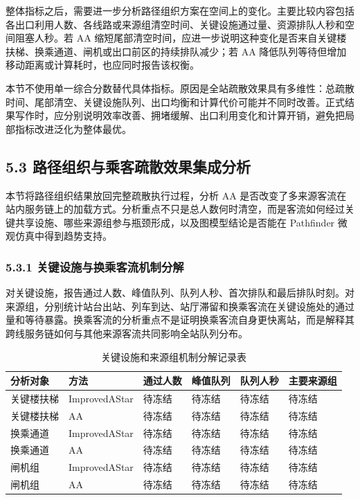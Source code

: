 \documentclass[UTF8,a4paper,12pt]{ctexart}
\begin{document}
整体指标之后，需要进一步分析路径组织方案在空间上的变化。主要比较内容包括各出口利用人数、各线路或来源组清空时间、关键设施通过量、资源排队人秒和空间阻塞人秒。若 AA 缩短尾部清空时间，应进一步说明这种变化是否来自关键楼扶梯、换乘通道、闸机或出口前区的持续排队减少；若 AA 降低队列等待但增加移动距离或计算耗时，也应同时报告该权衡。

本节不使用单一综合分数替代具体指标。原因是全站疏散效果具有多维性：总疏散时间、尾部清空、关键设施队列、出口均衡和计算代价可能并不同时改善。正式结果写作时，应分别说明效率改善、拥堵缓解、出口利用变化和计算开销，避免把局部指标改进泛化为整体最优。

\subsection{5.3 路径组织与乘客疏散效果集成分析}

本节将路径组织结果放回完整疏散执行过程，分析 AA 是否改变了多来源客流在站内服务链上的加载方式。分析重点不只是总人数何时清空，而是客流如何经过关键共享设施、哪些来源组参与瓶颈形成，以及图模型结论是否能在 Pathfinder 微观仿真中得到趋势支持。

\subsubsection{5.3.1 关键设施与换乘客流机制分解}

对关键设施，报告通过人数、峰值队列、队列人秒、首次排队和最后排队时刻。对来源组，分别统计站台出站、列车到达、站厅滞留和换乘客流在关键设施处的通过量和等待暴露。换乘客流的分析重点不是证明换乘客流自身更快离站，而是解释其跨线服务链如何与其他来源客流共同影响全站队列分布。

\begin{table}[htbp]
\centering
\caption{关键设施和来源组机制分解记录表}
\small
\begin{tabular}{p{}p{}p{}p{}p{}p{}}
\toprule
分析对象 & 方法 & 通过人数 & 峰值队列 & 队列人秒 & 主要来源组 \\
\midrule
关键楼扶梯 & ImprovedAStar & 待冻结 & 待冻结 & 待冻结 & 待冻结 \\
关键楼扶梯 & AA & 待冻结 & 待冻结 & 待冻结 & 待冻结 \\
换乘通道 & ImprovedAStar & 待冻结 & 待冻结 & 待冻结 & 待冻结 \\
换乘通道 & AA & 待冻结 & 待冻结 & 待冻结 & 待冻结 \\
闸机组 & ImprovedAStar & 待冻结 & 待冻结 & 待冻结 & 待冻结 \\
闸机组 & AA & 待冻结 & 待冻结 & 待冻结 & 待冻结 \\
\bottomrule
\end{tabular}
\end{table}
\end{document}
